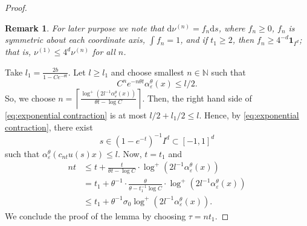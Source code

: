 \documentclass[10pt,a4paper]{amsart}
\newtheorem{remark}{Remark}
\newcommand{\N}{\mathbb{N}}
\newcommand{\de}{\mathrm{d}}
\newcommand{\eps}{\varepsilon}
\begin{document}
\begin{proof}
    \begin{remark} \label{rem:nu*n}
       For later purpose we note that $\de\nu^{(n)}=f_n\de s$, where $f_n\geq 0$, $f_n$ is symmetric about each coordinate axis, $\int f_n=1$, and if $t_1\geq 2$, then $f_n\geq 4^{-d}\mathbf{1}_{I^d}$; that is, $\nu^{(1)}\leq 4^d\nu^{(n)}$ for all $n$.  
    \end{remark}
        
        Take $l_1=\frac{2b}{1-Ce^{-\theta t}}$. Let $l\geq l_1$ and choose smallest $n\in\N$ such that 
        \[
        C^ne^{-n\theta t}\alpha_\eps^{\theta}(x)\leq l/2. 
        \]
        So, we choose
        $n=\left\lceil \frac{\log^+ (2l^{-1}\alpha_\eps^\theta(x))}{\theta t-\log C} \right\rceil$.
        Then, the right hand side of \eqref{eq:exponential contraction} is at most $l/2+l_1/2\leq l$. Hence, by \eqref{eq:exponential contraction}, there exist 
        \[
        s\in {(1-e^{-t})}^{-1}I^d\subset [-1,1]^d
        \]
        such that $\alpha_\eps^{\theta}(c_{nt}u(s)x)\leq l$.  Now, $t=t_1$ and
        \begin{align*}
            nt&\leq t+\frac{t}{\theta t-\log C}\cdot \log^+ (2l^{-1}\alpha_\eps^\theta(x)) \\
            &=t_1+\theta^{-1}\cdot \frac{\theta}{\theta-t_1^{-1}\log C}\cdot \log^+ (2l^{-1}\alpha_\eps^\theta(x))\\
            &\leq t_1+\theta^{-1}\sigma_0\log^+ (2l^{-1}\alpha_\eps^\theta(x)).
        \end{align*}
       We conclude the proof of the lemma by choosing $\tau=nt_1$.
    \end{proof}
\end{document}
